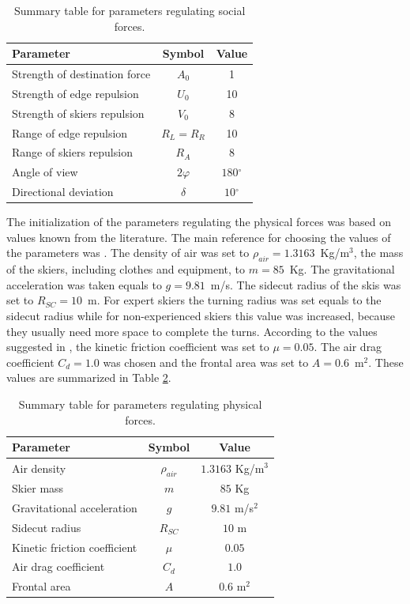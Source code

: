 \documentclass[12pt,a4paper,twoside]{book}
\newcommand{\degree}{\ensuremath{^\circ}}
\begin{document}
\begin{table}[!h]
  \centering
  \begin{tabular}{ | l | c | c | }
    \hline
    Parameter & Symbol & Value \\
    \hline
    Strength of destination force & $A_0$ & 1 \\
    Strength of edge repulsion & $U_0$ & 10 \\
    Strength of skiers repulsion & $V_0$ & 8 \\
    Range of edge repulsion & $R_L=R_R$ & 10 \\
    Range of skiers repulsion & $R_A$ & 8 \\
    Angle of view & $2\varphi$ & $180\degree$ \\
    Directional deviation & $\delta$ & $10\degree$ \\
    \hline
  \end{tabular}
  \caption{Summary table for parameters regulating social forces.}
  \label{social_parameters_table}
\end{table}

The initialization of the parameters regulating the physical forces was based on values known from the literature. The main reference for choosing the values of the parameters was \cite{hol2012}. The density of air was set to $\rho_{air}=1.3163 $~Kg/m$^{3}$, the mass of the skiers, including clothes and equipment, to $m=85$~Kg. The gravitational acceleration was taken equals to $g=9.81$~m/s. The sidecut radius of the skis was set to $R_{SC}=10$~m. For expert skiers the turning radius was set equals to the sidecut radius while for non-experienced skiers this value was increased, because they usually need more space to complete the turns. According to the values suggested in \cite{bu2004}, the kinetic friction coefficient was set to $\mu = 0.05$. The air drag coefficient $C_d = 1.0$ was chosen and the frontal area was set to $A=0.6 $~m$^2$. These values are summarized in Table \ref{physical_parameters_table}.

\begin{table}[!h]
  \centering
  \begin{tabular}{ | l | c | c |}
    \hline
    Parameter & Symbol & Value \\
    \hline
    Air density & $\rho_{air}$ & $1.3163$ Kg/m$^{3}$ \\
    Skier mass & $m$ & $85$ Kg \\
    Gravitational acceleration & $g$ & $9.81$ m/s$^2$ \\
    Sidecut radius & $R_{SC}$ & $10$ m \\
    Kinetic friction coefficient & $\mu$ & $0.05$ \\
    Air drag coefficient & $C_d$ & $1.0$ \\
    Frontal area & $A$ & $0.6$ m$^2$ \\
    \hline
  \end{tabular}
  \caption{Summary table for parameters regulating physical forces.}
  \label{physical_parameters_table}
\end{table}
\end{document}
